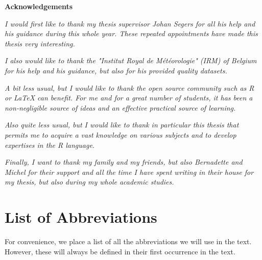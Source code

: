 \documentclass[11pt,a4paper,openany, twosided]{book}
\newcommand\blankpage{%
    \null
    \thispagestyle{empty}%
    \addtocounter{page}{-1}%
    \newpage}
\begin{document}
\newpage




\newenvironment{acknowledgements}%
{\thispagestyle{empty}\null\vfill\begin{center}%
\bfseries Acknowledgements\end{center}}%
{\vfill\null}
\begin{acknowledgements}
	\textit{I would first like to thank my thesis supervisor Johan Segers for all his help and his guidance during this whole year. These repeated appointments have made this thesis very interesting. }
	\newline
	
	\textit{I also would like to thank the "Institut Royal de Météorologie" (IRM) of Belgium for his help and his guidance, but also for his provided quality datasets.}
	\newline
	
	\textit{A bit less usual, but I would like to thank the open source community such as R or LaTeX can benefit. For me and for a great number of students, it has been a non-negligible source of ideas and an effective practical source of learning.  }
	\newline
	
	\textit{Also quite less usual, but I would like to thank in particular this thesis that permits me to acquire a vast knowledge on various subjects and to develop expertises in the R language. %
		}
   	\newline
   	
	\textit{Finally, I want to thank my family and my friends, but also Bernadette and Michel for their support and all the time I have spent  writing in their house for my thesis, but also during my whole academic studies.}
	
	\thispagestyle{empty}
\end{acknowledgements}


\afterpage{\blankpage}


\thispagestyle{empty}
\dominitoc
\thispagestyle{empty}
\tableofcontents
\thispagestyle{empty}
\newpage
\thispagestyle{empty}
\listoffigures
\thispagestyle{empty}
\listoftables
\thispagestyle{empty}

\newpage


\chapter*{List of Abbreviations}
\thispagestyle{empty}
For convenience, we place a list of all the abbreviations we will use in the text. However, these will always be defined in their first occurrence in the text.\\
\end{document}
